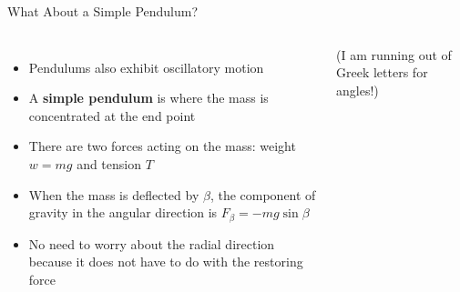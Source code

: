 \documentclass[12pt,compress,aspectratio=169]{beamer}
\newcommand{\mb}[1]{\ensuremath\mathbf{#1}}
\begin{document}
\begin{frame}{What About a Simple Pendulum?}
  \begin{columns}
    \begin{itemize}
    \item Pendulums also exhibit oscillatory motion
    \item A \textbf{simple pendulum} is where the mass is concentrated at the
      end point
    \item There are two forces acting on the mass: weight $w=mg$ and tension $T$
    \item When the mass is deflected by $\beta$, the component of gravity in
      the angular direction is $F_\beta=-mg\sin\beta$
    \item No need to worry about the radial direction because it does not
      have to do with the restoring force
    \end{itemize}
    (I am running out of Greek letters for angles!)
    
  \end{columns}
\end{frame}
\end{document}
